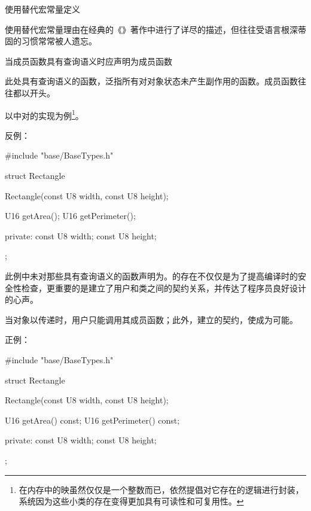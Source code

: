 \begin{content}

\begin{regulation}
使用替代宏常量定义
\end{regulation}

使用替代宏常量理由在经典的《》著作中进行了详尽的描述，但往往受\clang{}语言根深蒂固的习惯常常被人遗忘。

\begin{regulation}
当成员函数具有查询语义时应声明为成员函数
\end{regulation}

此处具有查询语义的函数，泛指所有对对象状态未产生副作用的函数。成员函数往往都以开头。

以中对的实现为例\footnote{在内存中的映虽然仅仅是一个整数而已，依然提倡对它存在的逻辑进行封装，系统因为这些小类的存在变得更加具有可读性和可复用性。}。

反例：
\begin{leftbar}
\begin{c++}
#include "base/BaseTypes.h"

struct Rectangle
{
    Rectangle(const U8 width, const U8 height);

    U16 getArea();
	U16 getPerimeter();

private:
    const U8 width;
	const U8 height;
};
\end{c++}
\end{leftbar}

此例中未对那些具有查询语义的函数声明为。的存在不仅仅是为了提高编译时的安全性检查，更重要的是建立了用户和类之间的契约关系，并传达了程序员良好设计的心声。

当对象以传递时，用户只能调用其成员函数；此外，建立的契约，使成为可能。

正例：
\begin{leftbar}
\begin{c++}
#include "base/BaseTypes.h"

struct Rectangle
{
    Rectangle(const U8 width, const U8 height);

    U16 getArea() const;
	U16 getPerimeter() const;

private:
    const U8 width;
	const U8 height;
};
\end{c++}
\end{leftbar}


\end{content}
